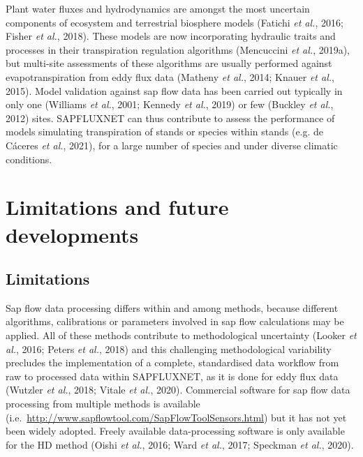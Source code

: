 \documentclass[11pt,twoside]{reedthesis}
\begin{document}
Plant water fluxes and hydrodynamics are amongst the most uncertain
components of ecosystem and terrestrial biosphere models (Fatichi
\emph{et al.}, 2016; Fisher \emph{et al.}, 2018). These models are now
incorporating hydraulic traits and processes in their transpiration
regulation algorithms (Mencuccini \emph{et al.}, 2019a), but multi-site
assessments of these algorithms are usually performed against
evapotranspiration from eddy flux data (Matheny \emph{et al.}, 2014;
Knauer \emph{et al.}, 2015). Model validation against sap flow data has
been carried out typically in only one (Williams \emph{et al.}, 2001;
Kennedy \emph{et al.}, 2019) or few (Buckley \emph{et al.}, 2012) sites.
SAPFLUXNET can thus contribute to assess the performance of models
simulating transpiration of stands or species within stands (e.g. de
Cáceres \emph{et al.}, 2021), for a large number of species and under
diverse climatic conditions.\par

\section{Limitations and future
developments}\label{limitations-and-future-developments}

\subsection{Limitations}\label{limitations}

Sap flow data processing differs within and among methods, because
different algorithms, calibrations or parameters involved in sap flow
calculations may be applied. All of these methods contribute to
methodological uncertainty (Looker \emph{et al.}, 2016; Peters \emph{et
al.}, 2018) and this challenging methodological variability precludes
the implementation of a complete, standardised data workflow from raw to
processed data within SAPFLUXNET, as it is done for eddy flux data
(Wutzler \emph{et al.}, 2018; Vitale \emph{et al.}, 2020). Commercial
software for sap flow data processing from multiple methods is available
(i.e.~\url{http://www.sapflowtool.com/SapFlowToolSensors.html}) but it
has not yet been widely adopted. Freely available data-processing
software is only available for the HD method (Oishi \emph{et al.}, 2016;
Ward \emph{et al.}, 2017; Speckman \emph{et al.}, 2020).\par
\end{document}
